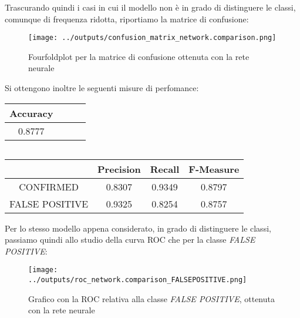 Trascurando quindi i casi in cui il modello non è in grado di distinguere le 
classi, comunque di frequenza ridotta, riportiamo la matrice di confusione:
\begin{figure}[H]
    \centering
    \texttt{[image: ../outputs/confusion\_matrix\_network.comparison.png]}
    \caption{Fourfoldplot per la matrice di confusione ottenuta con la rete neurale}
\end{figure}

Si ottengono inoltre le seguenti misure di perfomance:
\begin{center}
    \begin{tabular}{| c | c c c |} 
    \hline
    Accuracy \\ [0.5ex] 
    \hline\hline
    0.8777 \\ 
    \hline
    \end{tabular}
    $\qquad$
    \begin{tabular}{| c | c c c |} 
    \hline
    & Precision & Recall & F-Measure \\ [0.5ex] 
    \hline\hline
    CONFIRMED  & 0.8307 & 0.9349 & 0.8797 \\ 
    \hline
    FALSE POSITIVE & 0.9325 & 0.8254 & 0.8757 \\ 
    \hline
    \end{tabular}
\end{center}
Per lo stesso modello appena considerato, in grado di distinguere le classi,
passiamo quindi allo studio della curva ROC che per la classe 
\textit{FALSE POSITIVE}:
\begin{figure}[H]
    \centering
    \texttt{[image: ../outputs/roc\_network.comparison\_FALSEPOSITIVE.png]}
    \caption{Grafico con la ROC relativa alla classe \textit{FALSE POSITIVE}, ottenuta con 
    la rete neurale}
\end{figure}